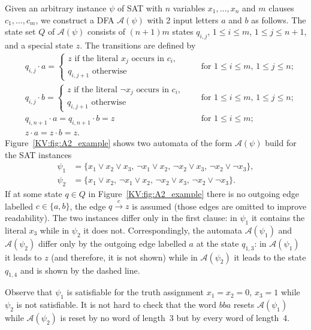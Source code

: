 \documentclass{irmaart}
\begin{document}
Given an arbitrary instance $\psi$ of \textsc{SAT} with $n$
variables $x_1,\dots,x_n$ and $m$ clauses $c_1,\dots,c_m$, we
construct a DFA $\mathcal{A}(\psi)$ with 2 input letters $a$ and
$b$ as follows. The state set $Q$ of $\mathcal{A}(\psi)$ consists
of $(n+1)m$ states $q_{i,j}$, $1 \le i \le m$, $1 \le j \le n+1$,
and a special state $z$. The transitions are defined by
\begin{align*}
& q_{i,j}\cdot a =
\begin{cases}
    z \text{ if the literal $x_j$ occurs in $c_i$},\\
    q_{i,j+1} \text{ otherwise}
\end{cases} && \text{ for $1 \le i \le m$, $1 \le j \le n$;} \\
&q_{i,j}\cdot b =
\begin{cases}
    z \text{ if the literal $\neg x_j$ occurs in $c_i$},\\
    q_{i,j+1} \text{ otherwise}
\end{cases} && \text{ for $1 \le i \le m$, $1 \le j \le n$;} \\
&q_{i,n+1}\cdot a=q_{i,n+1}\cdot b =z && \text{ for $1\le i\le
m$;}\\  &z\cdot a=z\cdot b =z.&&
\end{align*}
Figure~\ref{KV:fig:A2_example} shows two automata of the form
$\mathcal{A}(\psi)$ build for the \textsc{SAT} instances
\begin{align*}
\psi_1&=\{x_1 \vee x_2 \vee x_3,\, \neg x_1 \vee x_2,\, \neg x_2
\vee x_3,\,\neg x_2 \vee \neg x_3\},\\
\psi_2&=\{x_1 \vee x_2,\,\neg x_1 \vee x_2,\, \neg x_2 \vee
x_3,\,\neg x_2 \vee \neg x_3\}.
\end{align*}
If at some state $q\in Q$ in Figure~\ref{KV:fig:A2_example} there
is no outgoing edge labelled $c\in\{a,b\}$, the edge
$q\stackrel{c}{\to}z$ is assumed (those edges are omitted to
improve readability). The two instances differ only in the first
clause: in $\psi_1$ it contains the literal $x_3$ while in
$\psi_2$ it does not. Correspondingly, the automata
$\mathcal{A}(\psi_1)$ and $\mathcal{A}(\psi_2)$ differ only by the
outgoing edge labelled $a$ at the state $q_{1,3}$: in
$\mathcal{A}(\psi_1)$ it leads to $z$ (and therefore, it is not
shown) while in $\mathcal{A}(\psi_2)$ it leads to the state
$q_{1,4}$ and is shown by the dashed line.

Observe that $\psi_1$ is satisfiable for the truth assignment
$x_1=x_2=0$, $x_3=1$ while $\psi_2$ is not satisfiable. It is not
hard to check that the word $bba$ resets $\mathcal{A}(\psi_1)$
while $\mathcal{A}(\psi_2)$ is reset by no word of length~3 but by
every word of length~4.
\end{document}
